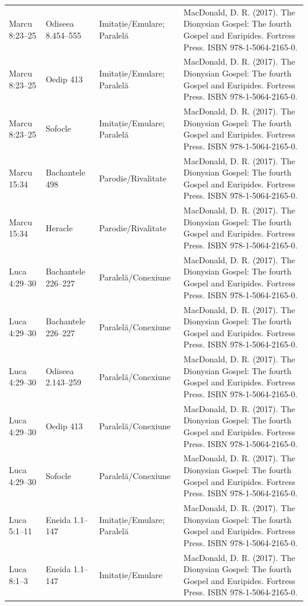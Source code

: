 \documentclass[12pt,a4paper,twoside,openany]{book}
\begin{document}
\begin{longtable}{L{1.4cm}L{1.7cm}L{3.1cm}L{8.4cm}}
Marcu 8:23–25 & Odiseea 8.454–555 & Imitație/Emulare; Paralelă & MacDonald, D. R. (2017). The Dionysian Gospel: The fourth Gospel and Euripides. Fortress Press. ISBN 978-1-5064-2165-0. \\
Marcu 8:23–25 & Oedip 413 & Imitație/Emulare; Paralelă & MacDonald, D. R. (2017). The Dionysian Gospel: The fourth Gospel and Euripides. Fortress Press. ISBN 978-1-5064-2165-0. \\
Marcu 8:23–25 & Sofocle & Imitație/Emulare; Paralelă & MacDonald, D. R. (2017). The Dionysian Gospel: The fourth Gospel and Euripides. Fortress Press. ISBN 978-1-5064-2165-0. \\
Marcu 15:34 & Bachantele 498 & Parodie/Rivalitate & MacDonald, D. R. (2017). The Dionysian Gospel: The fourth Gospel and Euripides. Fortress Press. ISBN 978-1-5064-2165-0. \\
Marcu 15:34 & Heracle & Parodie/Rivalitate & MacDonald, D. R. (2017). The Dionysian Gospel: The fourth Gospel and Euripides. Fortress Press. ISBN 978-1-5064-2165-0. \\
Luca 4:29–30 & Bachantele 226–227 & Paralelă/Conexiune & MacDonald, D. R. (2017). The Dionysian Gospel: The fourth Gospel and Euripides. Fortress Press. ISBN 978-1-5064-2165-0. \\
Luca 4:29–30 & Bachantele 226–227 & Paralelă/Conexiune & MacDonald, D. R. (2017). The Dionysian Gospel: The fourth Gospel and Euripides. Fortress Press. ISBN 978-1-5064-2165-0. \\
Luca 4:29–30 & Odiseea 2.143–259 & Paralelă/Conexiune & MacDonald, D. R. (2017). The Dionysian Gospel: The fourth Gospel and Euripides. Fortress Press. ISBN 978-1-5064-2165-0. \\
Luca 4:29–30 & Oedip 413 & Paralelă/Conexiune & MacDonald, D. R. (2017). The Dionysian Gospel: The fourth Gospel and Euripides. Fortress Press. ISBN 978-1-5064-2165-0. \\
Luca 4:29–30 & Sofocle & Paralelă/Conexiune & MacDonald, D. R. (2017). The Dionysian Gospel: The fourth Gospel and Euripides. Fortress Press. ISBN 978-1-5064-2165-0. \\
Luca 5:1–11 & Eneida 1.1–147 & Imitație/Emulare; Paralelă & MacDonald, D. R. (2017). The Dionysian Gospel: The fourth Gospel and Euripides. Fortress Press. ISBN 978-1-5064-2165-0. \\
Luca 8:1–3 & Eneida 1.1–147 & Imitație/Emulare & MacDonald, D. R. (2017). The Dionysian Gospel: The fourth Gospel and Euripides. Fortress Press. ISBN 978-1-5064-2165-0. \\

\end{longtable}
\end{document}

